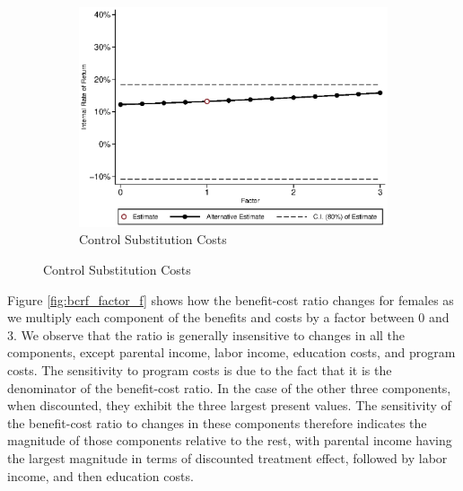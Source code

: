 \begin{figure}[H]
\ContinuedFloat		
	\begin{subfigure}[h]{0.8\textwidth}
	\centering
	\caption{Control Substitution Costs} \label{fig:irrf_cc_m1}
	\includegraphics[width=\textwidth]{AppOutput/Sensitivity/irrf_cc_m1.eps}
	\end{subfigure}
	
\end{figure}

\noindent Figure \ref{fig:bcrf_factor_f} shows how the benefit-cost ratio changes for females as
we multiply each component of the benefits and costs by a factor between 0 and 3. We 
observe that the ratio is generally insensitive to changes in all the components, 
except parental income, labor income, education costs, and program costs. The sensitivity
to program costs is due to the fact that it is the denominator of the 
benefit-cost ratio. In the case of the other three components, when discounted, 
they exhibit the three largest present values. The sensitivity of the benefit-cost
ratio to changes in these components therefore indicates the magnitude of those 
components relative to the rest, with parental income having the largest magnitude
in terms of discounted treatment effect, followed by labor income, and then
education costs. 

